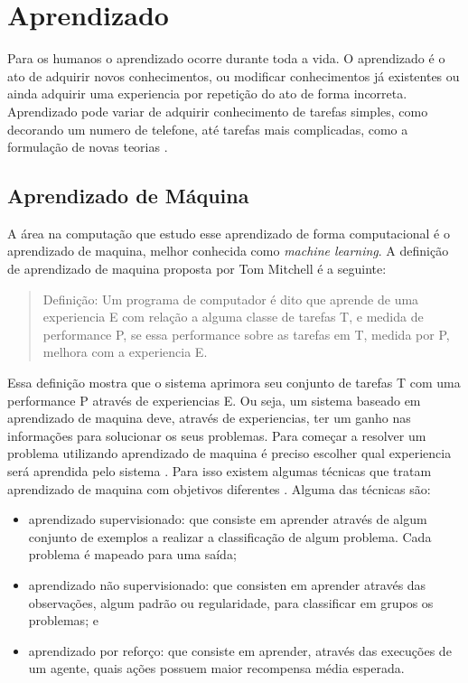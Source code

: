 \chapter{\label{chap:aprendizado}Aprendizado}
 
Para os humanos o aprendizado ocorre durante toda a vida. 
O aprendizado é o ato de adquirir novos conhecimentos, ou modificar conhecimentos já existentes ou ainda adquirir uma experiencia por repetição do ato de forma incorreta. 
Aprendizado pode variar de adquirir conhecimento de tarefas simples, como decorando um numero de telefone, até tarefas mais complicadas, como a formulação de novas teorias \cite{intelligence2003modern}. 

\section{Aprendizado de Máquina} 

A área na computação que estudo esse aprendizado de forma computacional é o aprendizado de maquina, melhor conhecida como \textit{machine learning}. 
A definição de aprendizado de maquina proposta por Tom Mitchell \cite{Mitchell1997ML} é a seguinte:

\begin{quote}
	Definição: Um programa de computador é dito que aprende de uma experiencia E com relação a alguma classe de tarefas T, e medida de performance P, se essa performance sobre as tarefas em T, medida por P, melhora com a experiencia E.
\end{quote}

Essa definição mostra que o sistema aprimora seu conjunto de tarefas T com uma performance P através de experiencias E. 
Ou seja, um sistema baseado em aprendizado de maquina deve, através de experiencias, ter um ganho nas informações para solucionar os seus problemas. 
Para começar a resolver um problema utilizando aprendizado de maquina é preciso escolher qual experiencia será aprendida pelo sistema \cite{Mitchell1997ML}. 
Para isso existem algumas técnicas que tratam aprendizado de maquina com objetivos diferentes \cite{intelligence2003modern}. 
Alguma das técnicas são: 
\begin{itemize}
	\item aprendizado supervisionado: que consiste em aprender através de algum conjunto de exemplos a realizar a classificação de algum problema. Cada problema é mapeado para uma saída;  
	\item aprendizado não supervisionado: que consisten em aprender através das observações, algum padrão ou regularidade, para classificar em grupos os problemas; e 
	\item aprendizado por reforço: que consiste em aprender, através das execuções de um agente, quais ações possuem maior recompensa média esperada.
\end{itemize}

